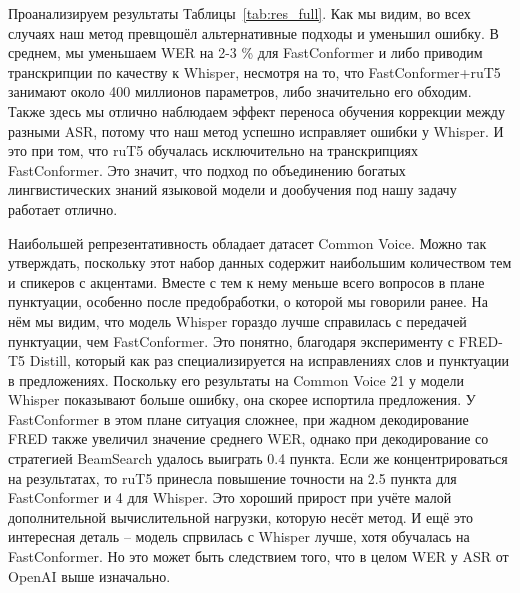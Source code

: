Проанализируем результаты Таблицы~\ref{tab:res_full}.
Как мы видим, во всех случаях наш метод превщошёл альтернативные подходы и уменьшил ошибку.
В среднем, мы уменьшаем WER на 2-3 \% для FastConformer и либо приводим транскрипции по качеству к Whisper, несмотря на то, что FastConformer+ruT5 занимают около 400 миллионов параметров, либо значительно его обходим.
Также здесь мы отлично наблюдаем эффект переноса обучения коррекции между разными ASR, потому что наш метод успешно исправляет ошибки у Whisper.
И это при том, что ruT5 обучалась исключительно на транскрипциях FastConformer.
Это значит, что подход по объединению богатых лингвистических знаний языковой модели и дообучения под нашу задачу работает отлично.

Наибольшей репрезентативность обладает датасет Common Voice.
Можно так утверждать, поскольку этот набор данных содержит наибольшим количеством тем и спикеров с акцентами.
Вместе с тем к нему меньше всего вопросов в плане пунктуации, особенно после предобработки, о которой мы говорили ранее.
На нём мы видим, что модель Whisper гораздо лучше справилась с передачей пунктуации, чем FastConformer.
Это понятно, благодаря эксперименту с FRED-T5 Distill, который как раз специализируется на исправлениях слов и пунктуации в предложениях.
Поскольку его результаты на Common Voice 21 у модели Whisper показывают больше ошибку, она скорее испортила предложения.
У FastConformer в этом плане ситуация сложнее, при жадном декодирование FRED также увеличил значение среднего WER, однако при декодирование со стратегией BeamSearch удалось выиграть 0.4 пункта.
Если же концентрироваться на результатах, то ruT5 принесла повышение точности на 2.5 пункта для FastConformer и 4 для Whisper.
Это хороший прирост при учёте малой дополнительной вычислительной нагрузки, которую несёт метод.
И ещё это интересная деталь -- модель спрвилась с Whisper лучше, хотя обучалась на FastConformer.
Но это может быть следствием того, что в целом WER у ASR от OpenAI выше изначально.

